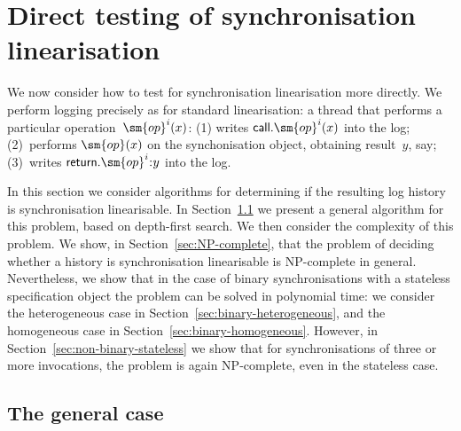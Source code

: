 \section{Direct testing of synchronisation linearisation}
\label{sec:direct}

We now consider how to test for synchronisation linearisation more directly.
We perform logging precisely as for standard linearisation: a thread that
performs a particular operation~$\sm{op}^i(x)$: (1) writes
$\call.\sm{op}^i(x)$ into the log; (2)~performs $\sm{op}(x)$ on the
synchonisation object, obtaining result~$y$, say; (3)~writes
$\return.\sm{op}^i \:: y$ into the log.

In this section we consider algorithms for determining if the resulting log
history is synchronisation linearisable.  In Section~\ref{sec:algorithm-dfs}
we present a general algorithm for this problem, based on depth-first search.
We then consider the complexity of this problem.  We show, in
Section~\ref{sec:NP-complete}, that the problem of deciding whether a history
is synchronisation linearisable is NP-complete in general.  Nevertheless, we
show that in the case of binary synchronisations with a stateless
specification object the problem can be solved in polynomial time: we consider
the heterogeneous case in Section~\ref{sec:binary-heterogeneous}, and the
homogeneous case in Section~\ref{sec:binary-homogeneous}.  However, in
Section~\ref{sec:non-binary-stateless} we show that for synchronisations of
three or more invocations, the problem is again NP-complete, even in the
stateless case.





\subsection{The general case}
\label{sec:algorithm-dfs}

